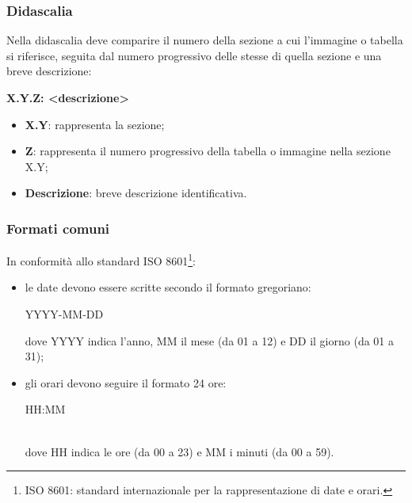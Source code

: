 \subsubsection{Didascalia}
Nella didascalia deve comparire il numero della sezione a cui l'immagine o tabella si riferisce, seguita dal numero progressivo delle stesse di quella sezione e una breve descrizione: \\
\centerline{\textbf{X.Y.Z: <descrizione>}}
\begin{itemize}
\item \textbf{X.Y}: rappresenta la sezione;
\item \textbf{Z}: rappresenta il numero progressivo della tabella o immagine nella sezione X.Y;
\item \textbf{Descrizione}: breve descrizione identificativa.
\end{itemize}

\subsubsection{Formati comuni}
In conformità allo standard ISO 8601\footnote{ISO 8601: standard internazionale per la rappresentazione di date e orari.}:\begin{itemize}
\item le date devono essere scritte secondo il formato gregoriano: \\
	\centerline{YYYY-MM-DD}
	dove YYYY indica l'anno, MM il mese (da 01 a 12) e DD il giorno (da 01 a 31);
\item gli orari devono seguire il formato 24 ore: \\
	\centerline{HH:MM} \\
	dove HH indica le ore (da 00 a 23) e MM i minuti (da 00 a 59).
\end{itemize} 


